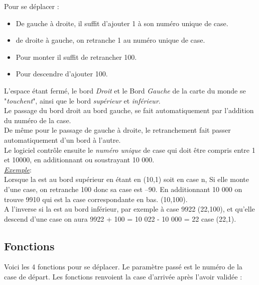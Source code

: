 \documentclass[french]{report}
\begin{document}
Pour se déplacer :
\begin{itemize}
	\item De gauche à droite, il suffit d'ajouter 1 à son numéro unique de case.
	\item de droite à gauche, on retranche 1 au numéro unique de case.
	\item Pour monter il suffit de retrancher 100.
	\item Pour descendre d'ajouter 100.\\
\end{itemize}

L'espace étant fermé, le bord \textit{Droit} et le Bord \textit{Gauche} de la carte du monde se "\textit{touchent}", ainsi que le bord \textit{supérieur} et \textit{inférieur}.\\
Le passage du bord droit au bord gauche, se fait automatiquement par l'addition du numéro de la case.\\
De même pour le passage de gauche à droite, le retranchement  fait passer automatiquement d'un bord à l'autre.\\

Le logiciel contrôle ensuite le \textit{numéro unique} de case qui doit être compris entre 1 et 10000, en additionnant ou soustrayant 10 000. \\

\textit{\underline{Exemple}}:\\
Lorsque la \CoCiX est au bord supérieur en étant  en (10,1) soit en case n,  Si elle monte d'une case, on retranche 100 donc sa case est  --90. En additionnant 10 000 on trouve 9910 qui est la case correspondante en bas. (10,100).\\
A l'inverse si la \CoCiX est au bord inférieur, par exemple à case 9922 (22,100), et qu'elle descend d'une case on aura 9922 + 100 = 10 022 - 10 000 = 22 case (22,1).

\subsection{Fonctions}
Voici les 4 fonctions pour se déplacer. Le paramètre passé est le numéro de la case de départ. Les fonctions renvoient la case d'arrivée après l'avoir validée : \\
\end{document}
